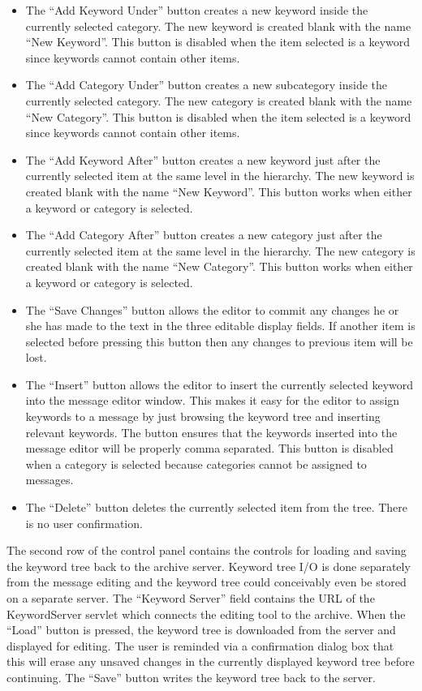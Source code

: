 \begin{itemize}
\item The ``Add Keyword Under'' button creates a new keyword inside the
  currently selected category. The new keyword is created blank with the name
  ``New Keyword''. This button is disabled when the item selected is a keyword
  since keywords cannot contain other items.
\item The ``Add Category Under'' button creates a new subcategory inside the
  currently selected category. The new category is created blank with the name
  ``New Category''. This button is disabled when the item selected is a
  keyword since keywords cannot contain other items.
\item The ``Add Keyword After'' button creates a new keyword just after the
  currently selected item at the same level in the hierarchy. The new keyword
  is created blank with the name ``New Keyword''. This button works when either
  a keyword or category is selected.
\item The ``Add Category After'' button creates a new category just after the
  currently selected item at the same level in the hierarchy. The new category
  is created blank with the name ``New Category''. This button works when
  either a keyword or category is selected.
\item The ``Save Changes'' button allows the editor to commit any changes he or
  she has made to the text in the three editable display fields. If another
  item is selected before pressing this button then any changes to previous
  item will be lost.
\item The ``Insert'' button allows the editor to insert the currently selected
  keyword into the message editor window. This makes it easy for the editor to
  assign keywords to a message by just browsing the keyword tree and inserting
  relevant keywords. The button ensures that the keywords inserted into the
  message editor will be properly comma separated. This button is disabled when
  a category is selected because categories cannot be assigned to messages.
\item The ``Delete'' button deletes the currently selected item from the tree.
  There is no user confirmation.
\end{itemize}

The second row of the control panel contains the controls for loading and
saving the keyword tree back to the archive server. Keyword tree I/O is done
separately from the message editing and the keyword tree could conceivably even
be stored on a separate server. The ``Keyword Server'' field contains the URL
of the KeywordServer servlet which connects the editing tool to the
archive. When the ``Load'' button is pressed, the keyword tree is downloaded
from the server and displayed for editing. The user is reminded via a
confirmation dialog box that this will erase any unsaved changes in the
currently displayed keyword tree before continuing. The ``Save'' button writes
the keyword tree back to the server.

